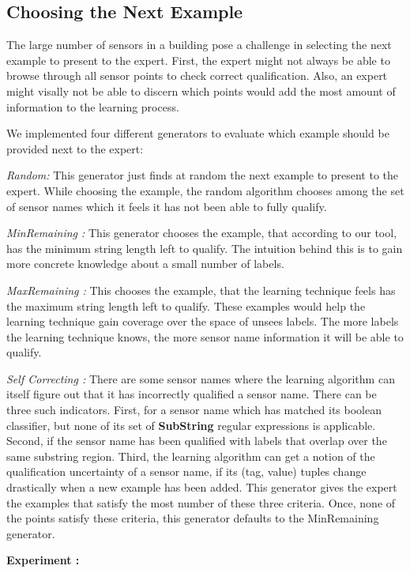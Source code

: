\subsection{Choosing the Next Example}


The large number of sensors in a building pose a challenge in selecting the next example to present to the expert. First, the expert might not always be able to browse through all sensor points to check correct qualification. Also, an expert might visally not be able to discern which points would add the most amount of information to the learning process. 

We implemented four different generators to evaluate which example should be provided next to the expert:

{\it Random:} This generator just finds at random the next example to present to the expert. While choosing the example, the random algorithm chooses among the set of sensor names which it feels it has not been able to fully qualify.  

{\it MinRemaining :} This generator chooses the example, that according to our tool, has the minimum string length left to qualify. The intuition behind this is to gain more concrete knowledge about a small number of labels.

{\it MaxRemaining :} This chooses the example, that the learning technique feels has the maximum string length left to qualify. These examples would help the learning technique gain coverage over the space of unsees labels. The more labels the learning technique knows, the more sensor name information it will be able to qualify.

{\it Self Correcting :} There are some sensor names where the learning algorithm can itself figure out that it has incorrectly qualified a sensor name. There can be three such indicators. First, for a sensor name which has matched its boolean classifier, but none of its set of {\bf SubString} regular expressions is applicable. Second, if the sensor name has been qualified with labels that overlap over the same substring region. Third, the learning algorithm can get a notion of the qualification uncertainty of a sensor name, if its (tag, value) tuples change drastically when a new example has been added. This generator gives the expert the examples that satisfy the most number of these three criteria. Once, none of the points satisfy these criteria, this generator defaults to the MinRemaining generator.

{\bf Experiment :}

